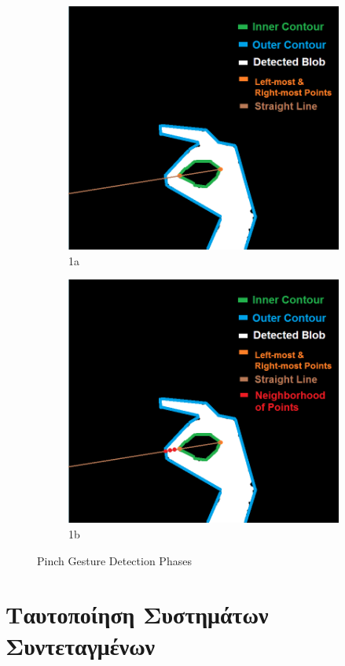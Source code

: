 \begin{figure}
\begin{subfigure}{.5\textwidth}
  \includegraphics[width=.8\linewidth]{Files/Figures/4.png}
  \caption{1a}
  \label{fig:sfig1}
\end{subfigure}%
\begin{subfigure}{.5\textwidth}
  \centering
  \includegraphics[width=.8\linewidth]{Files/Figures/5.png}
  \caption{1b}
  \label{fig:sfig2}
\end{subfigure}
\caption{Pinch Gesture Detection Phases}
\label{fig:fig}
\end{figure}




\section{Tαυτοποίηση Συστημάτων Συντεταγμένων}

